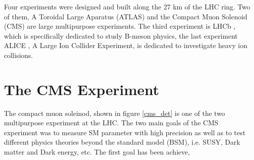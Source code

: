 Four experiments were designed and built along the 27 km of the LHC ring. %
Two of them, A Toroidal Large Aparatus (ATLAS)\cite{atlas} and the Compact Muon Solenoid (CMS)\cite{cms_doc} are large multipurpose experiments. The third experiment is LHCb \cite{lhcb}, which is specifically dedicated to study B-meson physics, the last experiment ALICE \cite{alice}, A Large Ion Collider Experiment, is dedicated to investigate heavy ion collisions.

 















\section{The CMS Experiment}
The compact muon soleinod, shown in figure \ref{cms_det} is one of the two multipurpose experiment at the LHC. The two main goals of the CMS experiment was to measure SM parameter with high precision as well as to test different physics theories beyond the standard model (BSM), i.e. SUSY, Dark matter and Dark energy, etc. The first goal has been achieve,    

